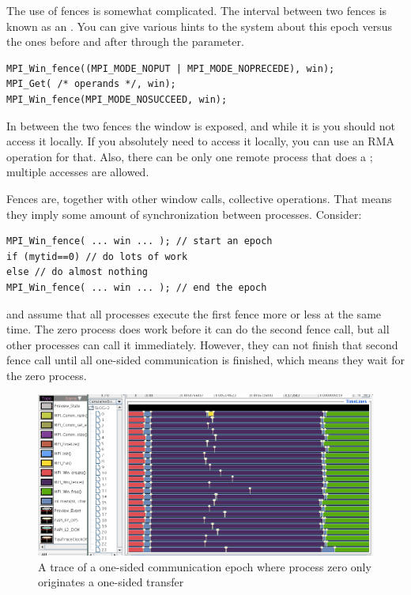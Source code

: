 The use of fences is somewhat complicated. The interval between two fences
is known as an .
You can give various hints to the system about this epoch versus the ones
before and after through the  parameter.
\begin{lstlisting}
MPI_Win_fence((MPI_MODE_NOPUT | MPI_MODE_NOPRECEDE), win);
MPI_Get( /* operands */, win);
MPI_Win_fence(MPI_MODE_NOSUCCEED, win);
\end{lstlisting}
In between the two fences the window is exposed, and while it is you
should not access it locally. If you absolutely need to access it
locally, you can use an \ac{RMA} operation for that. Also, there can be only one
remote process that does a ; multiple  accesses are allowed.

Fences are, together with other window calls, collective operations. That means they 
imply some amount of synchronization between processes. Consider:
\begin{lstlisting}
MPI_Win_fence( ... win ... ); // start an epoch
if (mytid==0) // do lots of work
else // do almost nothing
MPI_Win_fence( ... win ... ); // end the epoch
\end{lstlisting}
and assume that all processes execute the first fence more or less at the same time.
The zero process does work before it can do the second fence call, but all other
processes can call it immediately. However, they can not finish that second fence call
until all one-sided communication is finished, which means they wait for the zero process.
\begin{figure}[ht]
  \includegraphics[scale=.4]{graphics/lonestar-twonode-put}%
  \caption{A trace of a one-sided communication epoch where process zero only originates
  a one-sided transfer}
  \label{fig:putblock}
\end{figure}

